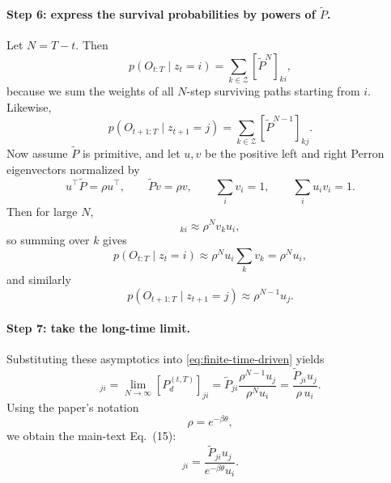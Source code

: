 \documentclass[11pt]{article}
\begin{document}
\paragraph{Step 6: express the survival probabilities by powers of \(\widetilde{P}\).}
Let \(N=T-t\). Then
\begin{equation}
    p(O_{t:T}\mid z_t=i)
    =
    \sum_{k\in\mathcal{Z}}[\widetilde{P}^{N}]_{ki},
\end{equation}
because we sum the weights of all \(N\)-step surviving paths starting from \(i\). Likewise,
\begin{equation}
    p(O_{t+1:T}\mid z_{t+1}=j)
    =
    \sum_{k\in\mathcal{Z}}[\widetilde{P}^{N-1}]_{kj}.
\end{equation}
Now assume \(\widetilde{P}\) is primitive, and let \(u,v\) be the positive left and right
Perron eigenvectors normalized by
\begin{equation}
    u^\top \widetilde{P}=\rho u^\top,
    \qquad
    \widetilde{P}v=\rho v,
    \qquad
    \sum_i v_i=1,
    \qquad
    \sum_i u_iv_i=1.
\end{equation}
Then for large \(N\),
\begin{equation}
    [\widetilde{P}^{N}]_{ki}
    \approx
    \rho^N v_k u_i,
\end{equation}
so summing over \(k\) gives
\begin{equation}
    p(O_{t:T}\mid z_t=i)
    \approx
    \rho^N u_i \sum_k v_k
    =
    \rho^N u_i,
\end{equation}
and similarly
\begin{equation}
    p(O_{t+1:T}\mid z_{t+1}=j)
    \approx
    \rho^{N-1}u_j.
\end{equation}

\paragraph{Step 7: take the long-time limit.}
Substituting these asymptotics into \eqref{eq:finite-time-driven} yields
\begin{equation}
    [P_d]_{ji}
    =
    \lim_{N\to\infty}[P_d^{(t,T)}]_{ji}
    =
    \widetilde{P}_{ji}\frac{\rho^{N-1}u_j}{\rho^N u_i}
    =
    \frac{\widetilde{P}_{ji}u_j}{\rho\,u_i}.
\end{equation}
Using the paper's notation
\begin{equation}
    \rho=e^{-\beta\theta},
\end{equation}
we obtain the main-text Eq.~(15):
\begin{equation}
    [P_d]_{ji}
    =
    \frac{\widetilde{P}_{ji}u_j}{e^{-\beta\theta}u_i}.
    \label{eq:doob-h-transform}
\end{equation}
\end{document}

